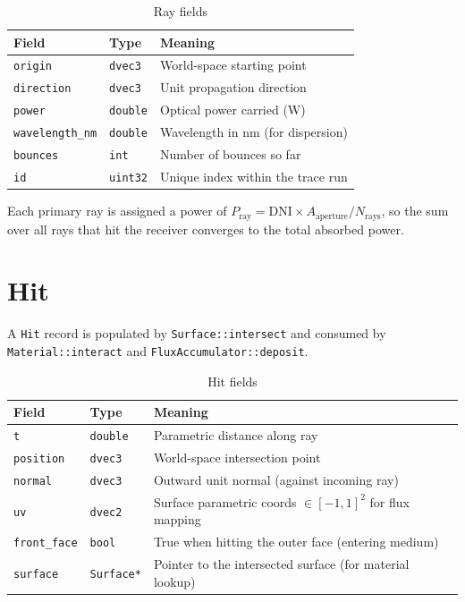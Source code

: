 \documentclass[12pt,a4paper]{report}
\begin{document}
\begin{table}[H]\centering
\caption{Ray fields}
\begin{tabular}{lll}
\toprule
Field & Type & Meaning \\
\midrule
\texttt{origin}         & \texttt{dvec3}   & World-space starting point \\
\texttt{direction}      & \texttt{dvec3}   & Unit propagation direction \\
\texttt{power}          & \texttt{double}  & Optical power carried (W) \\
\texttt{wavelength\_nm} & \texttt{double}  & Wavelength in nm (for dispersion) \\
\texttt{bounces}        & \texttt{int}     & Number of bounces so far \\
\texttt{id}             & \texttt{uint32}  & Unique index within the trace run \\
\bottomrule
\end{tabular}
\end{table}

Each primary ray is assigned a power of $P_{\text{ray}} = \text{DNI} \times A_{\text{aperture}} / N_{\text{rays}}$,
so the sum over all rays that hit the receiver converges to the total absorbed power.

\section{Hit}

A \texttt{Hit} record is populated by \texttt{Surface::intersect} and consumed by
\texttt{Material::interact} and \texttt{FluxAccumulator::deposit}.

\begin{table}[H]\centering
\caption{Hit fields}
\begin{tabular}{lll}
\toprule
Field & Type & Meaning \\
\midrule
\texttt{t}          & \texttt{double}   & Parametric distance along ray \\
\texttt{position}   & \texttt{dvec3}    & World-space intersection point \\
\texttt{normal}     & \texttt{dvec3}    & Outward unit normal (against incoming ray) \\
\texttt{uv}         & \texttt{dvec2}    & Surface parametric coords $\in [-1,1]^2$ for flux mapping \\
\texttt{front\_face}& \texttt{bool}     & True when hitting the outer face (entering medium) \\
\texttt{surface}    & \texttt{Surface*} & Pointer to the intersected surface (for material lookup) \\
\bottomrule
\end{tabular}
\end{table}
\end{document}
